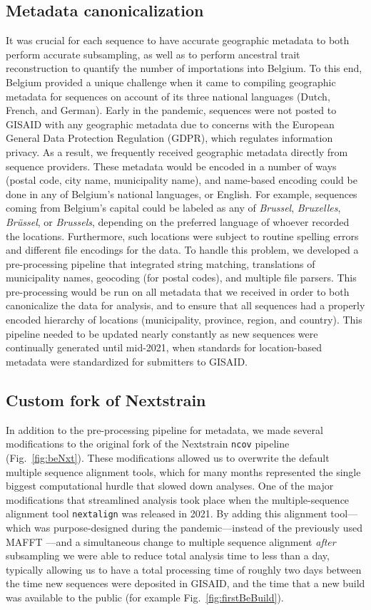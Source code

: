 \subsection{Metadata canonicalization}
It was crucial for each sequence to have accurate geographic metadata to both perform accurate subsampling, as well as to perform ancestral trait reconstruction to quantify the number of importations into Belgium.
To this end, Belgium provided a unique challenge when it came to compiling geographic metadata for sequences on account of its three national languages (Dutch, French, and German).
Early in the pandemic, sequences were not posted to GISAID with any geographic metadata due to concerns with the European General Data Protection Regulation (GDPR), which regulates information privacy.
As a result, we frequently received geographic metadata directly from sequence providers.
These metadata would be encoded in a number of ways (postal code, city name, municipality name), and name-based encoding could be done in any of Belgium's national languages, or English.
For example, sequences coming from Belgium's capital could be labeled as any of \textit{Brussel}, \textit{Bruxelles}, \textit{Br\"{u}ssel}, or \textit{Brussels}, depending on the preferred language of whoever recorded the locations.
Furthermore, such locations were subject to routine spelling errors and different file encodings for the data.
To handle this problem, we developed a pre-processing pipeline that integrated string matching, translations of municipality names, geocoding (for postal codes), and multiple file parsers.
This pre-processing would be run on all metadata that we received in order to both canonicalize the data for analysis, and to ensure that all sequences had a properly encoded hierarchy of locations (municipality, province, region, and country).
This pipeline needed to be updated nearly constantly as new sequences were continually generated until mid-2021, when standards for location-based metadata were standardized for submitters to GISAID.

\subsection{Custom fork of Nextstrain}
In addition to the pre-processing pipeline for metadata, we made several modifications to the original fork of the Nextstrain \verb|ncov| pipeline (Fig.~\ref{fig:beNxt}).
These modifications allowed us to overwrite the default multiple sequence alignment tools, which for many months represented the single biggest computational hurdle that slowed down analyses.
One of the major modifications that streamlined analysis took place when the multiple-sequence alignment tool \verb|nextalign| \citep{aksamentov2021nextclade} was released in 2021.
By adding this alignment tool---which was purpose-designed during the pandemic---instead of the previously used MAFFT \citep{katoh2013mafft}---and a simultaneous change to multiple sequence alignment \textit{after} subsampling we were able to reduce total analysis time to less than a day, typically allowing us to have a total processing time of roughly two days between the time new sequences were deposited in GISAID, and the time that a new build was available to the public (for example Fig.~\ref{fig:firstBeBuild}).

